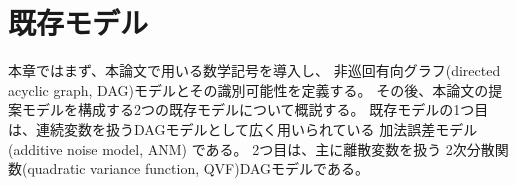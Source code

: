 
\section{既存モデル}
\label{part:model}

本章ではまず、本論文で用いる数学記号を導入し、
非巡回有向グラフ(directed acyclic graph, DAG)モデルとその識別可能性を定義する。
その後、本論文の提案モデルを構成する2つの既存モデルについて概説する。
既存モデルの1つ目は、連続変数を扱うDAGモデルとして広く用いられている
加法誤差モデル(additive noise model, ANM)
\cite{Shimizu2006-yu}
\cite{Hoyer2008-oo}
\cite{Peters2013-eb}
\cite{Peters2014-ro}
\cite{Park2020-ey}
である。
2つ目は、主に離散変数を扱う
2次分散関数(quadratic variance function, QVF)DAGモデル\cite{Park2017-hw}である。



%

%

%

